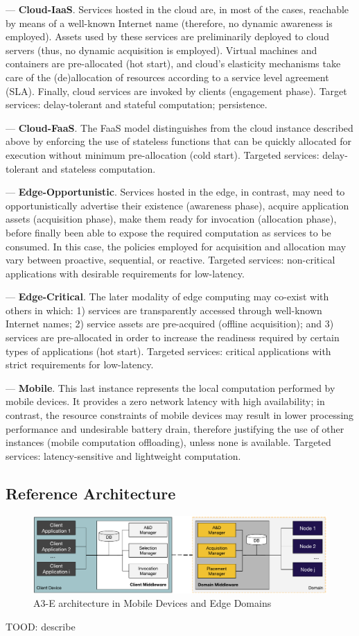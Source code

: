 --- \textbf{Cloud-IaaS}. Services hosted in the cloud are, in most of the cases, reachable by means of a well-known Internet name (therefore, no dynamic awareness is employed). Assets used by these services are preliminarily deployed to cloud servers (thus, no dynamic acquisition is employed). Virtual machines and containers are pre-allocated (hot start), and cloud's elasticity mechanisms take care of the (de)allocation of resources according to a service level agreement (SLA). Finally, cloud services are invoked by clients (engagement phase). Target services: delay-tolerant and stateful computation; persistence.

--- \textbf{Cloud-FaaS}. The FaaS model distinguishes from the cloud instance described above by enforcing the use of stateless functions that can be quickly allocated for execution without minimum pre-allocation (cold start). Targeted services: delay-tolerant and stateless computation.

--- \textbf{Edge-Opportunistic}. Services hosted in the edge, in contrast, may need to opportunistically advertise their existence (awareness phase), acquire application assets (acquisition phase), make them ready for invocation (allocation phase), before finally been able to expose the required computation as services to be consumed. In this case, the policies employed for acquisition and allocation may vary between proactive, sequential, or reactive. Targeted services: non-critical applications with desirable requirements for low-latency.

--- \textbf{Edge-Critical}. The later modality of edge computing may co-exist with others in which: 1) services are transparently accessed through well-known Internet names; 2) service assets are pre-acquired (offline acquisition); and 3) services are pre-allocated in order to increase the readiness required by certain types of applications (hot start). Targeted services: critical applications with strict requirements for low-latency.

--- \textbf{Mobile}. This last instance represents the local computation performed by mobile devices. It provides a zero network latency with high availability; in contrast, the resource constraints of mobile devices may result in lower processing performance and undesirable battery drain, therefore justifying the use of other instances (mobile computation offloading), unless none is available. Targeted services: latency-sensitive and lightweight computation.


\subsection{Reference Architecture}

\begin{figure}[tbp]
	\includegraphics[width=.95\textwidth]{figs/A3-E-reference-architecture}
	\caption{A3-E architecture in Mobile Devices and Edge Domains}
	\label{fig:reference-architecture}
	\end{figure}
	
TOOD: describe